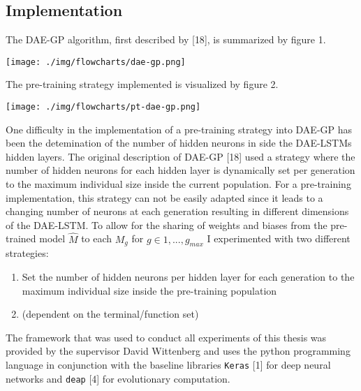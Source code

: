 \documentclass[
  11pt,
]{article}
\providecommand{\tightlist}{%
  \setlength{\itemsep}{0pt}\setlength{\parskip}{0pt}}
\let\origfigure\figure
\let\endorigfigure\endfigure
\renewenvironment{figure}[1][2] {
    \expandafter\origfigure\expandafter[H]
} {
    \endorigfigure
}
\begin{document}
\hypertarget{implementation}{%
\subsection{Implementation}\label{implementation}}

The DAE-GP algorithm, first described by {[}18{]}, is summarized by
figure 1.

\begin{figure}
\centering
\texttt{[image: ./img/flowcharts/dae-gp.png]}
\caption{Flowchart - Regular DAE-GP}
\end{figure}

The pre-training strategy implemented is visualized by figure 2.

\begin{figure}
\centering
\texttt{[image: ./img/flowcharts/pt-dae-gp.png]}
\caption{Flowchart - Pre-Trained DAE-GP}
\end{figure}

One difficulty in the implementation of a pre-training strategy into
DAE-GP has been the detemination of the number of hidden neurons in side
the DAE-LSTMs hidden layers. The original description of DAE-GP {[}18{]}
used a strategy where the number of hidden neurons for each hidden layer
is dynamically set per generation to the maximum individual size inside
the current population. For a pre-training implementation, this strategy
can not be easily adapted since it leads to a changing number of neurons
at each generation resulting in different dimensions of the DAE-LSTM. To
allow for the sharing of weights and biases from the pre-trained model
\(\hat{M}\) to each \(M_g\) for \(g\in{1,...,g_{max}}\) I experimented
with two different strategies:

\begin{enumerate}
\def\labelenumi{\arabic{enumi}.}
\tightlist
\item
  Set the number of hidden neurons per hidden layer for each generation
  to the maximum individual size inside the pre-training population
\item
  (dependent on the terminal/function set)
\end{enumerate}

The framework that was used to conduct all experiments of this thesis
was provided by the supervisor David Wittenberg and uses the python
programming language in conjunction with the baseline libraries
\texttt{Keras} {[}1{]} for deep neural networks and \texttt{deap}
{[}4{]} for evolutionary computation.
\end{document}
